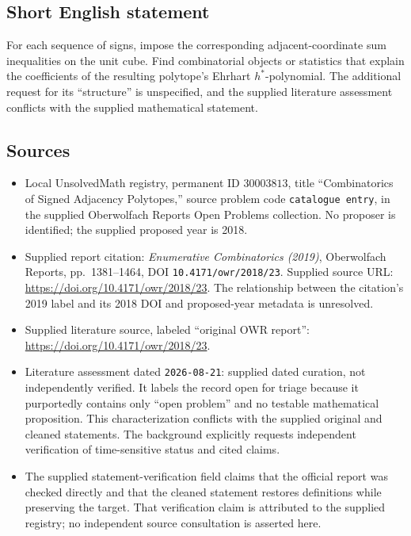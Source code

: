 \documentclass[11pt]{article}
\begin{document}
\subsection{Short English statement}
For each sequence of signs, impose the corresponding adjacent-coordinate sum inequalities on the unit cube. Find combinatorial objects or statistics that explain the coefficients of the resulting polytope's Ehrhart \(h^*\)-polynomial. The additional request for its ``structure'' is unspecified, and the supplied literature assessment conflicts with the supplied mathematical statement.
\subsection{Sources}
\begin{itemize}
\item Local UnsolvedMath registry, permanent ID \(30003813\), title ``Combinatorics of Signed Adjacency Polytopes,'' source problem code \texttt{catalogue entry}, in the supplied Oberwolfach Reports Open Problems collection. No proposer is identified; the supplied proposed year is 2018.
\item Supplied report citation: \emph{Enumerative Combinatorics (2019)}, Oberwolfach Reports, pp.\ 1381--1464, DOI \texttt{10.4171/owr/2018/23}. Supplied source URL: \url{https://doi.org/10.4171/owr/2018/23}. The relationship between the citation's 2019 label and its 2018 DOI and proposed-year metadata is unresolved.
\item Supplied literature source, labeled ``original OWR report'': \url{https://doi.org/10.4171/owr/2018/23}.
\item Literature assessment dated \texttt{2026-08-21}: supplied dated curation, not independently verified. It labels the record open for triage because it purportedly contains only ``open problem'' and no testable mathematical proposition. This characterization conflicts with the supplied original and cleaned statements. The background explicitly requests independent verification of time-sensitive status and cited claims.
\item The supplied statement-verification field claims that the official report was checked directly and that the cleaned statement restores definitions while preserving the target. That verification claim is attributed to the supplied registry; no independent source consultation is asserted here.
\end{itemize}
\end{document}
